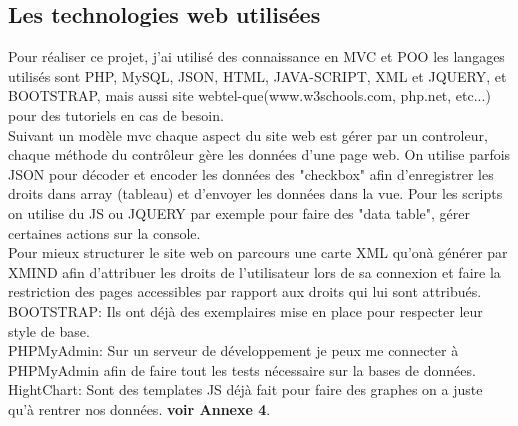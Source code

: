 \subsection{Les technologies web utilisées}
Pour réaliser ce projet, j'ai utilisé des connaissance en MVC et POO les langages utilisés sont PHP, MySQL, JSON, HTML, JAVA-SCRIPT, XML et JQUERY, et BOOTSTRAP, mais aussi site webtel-que(www.w3schools.com, php.net, etc...) pour des tutoriels en cas de besoin.\\
Suivant un modèle mvc chaque aspect du site web est gérer par un controleur, chaque méthode du contrôleur gère les données d'une page web. On utilise parfois JSON  pour décoder et encoder les données  des "checkbox" afin d'enregistrer les droits dans array (tableau) et d'envoyer les données dans la vue.
Pour les scripts on utilise du JS ou JQUERY par exemple pour faire des "data table", gérer certaines actions sur la console.\\
Pour mieux structurer le site web on parcours une carte XML qu'onà  générer par XMIND afin d'attribuer les droits de l'utilisateur lors de sa connexion et faire la restriction des pages accessibles par rapport aux droits qui lui sont attribués.\\
BOOTSTRAP: Ils ont déjà des exemplaires mise en place pour respecter leur style de base.\\
PHPMyAdmin: Sur un serveur de développement je peux me connecter à PHPMyAdmin afin de faire tout les tests nécessaire sur la bases de données.
HightChart: Sont des templates JS déjà fait pour faire des graphes on a juste qu'à rentrer nos données. \textbf{voir Annexe 4}. 



























